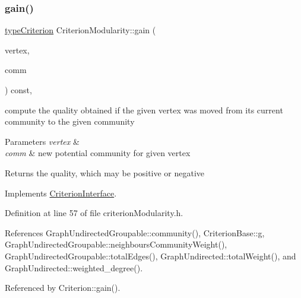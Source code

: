 \subsubsection{\texorpdfstring{gain()}{gain()}}
{\footnotesize\ttfamily \hyperlink{criterionInterface_8h_af71ff22f6355fd69a4a62104bfd59a83}{type\+Criterion} Criterion\+Modularity\+::gain (\begin{DoxyParamCaption}\item[{const \hyperlink{edge_8h_a5fbd20c46956d479cb10afc9855223f6}{type\+Vertex} \&}]{vertex,  }\item[{const \hyperlink{graphUndirectedGroupable_8h_a914da95c9ea7f14f4b7f875c36818556}{type\+Community} \&}]{comm }\end{DoxyParamCaption}) const\hspace{0.3cm}{\ttfamily [inline]}, {\ttfamily [virtual]}}

compute the quality obtained if the given vertex was moved from its current community to the given community


\begin{DoxyParams}{Parameters}
{\em vertex} & \\
\hline
{\em comm} & new potential community for given vertex \\
\hline
\end{DoxyParams}
\begin{DoxyReturn}{Returns}
the quality, which may be positive or negative 
\end{DoxyReturn}


Implements \hyperlink{classCriterionInterface_aa0beec8287cd70e16c057e7995d0caca}{Criterion\+Interface}.



Definition at line 57 of file criterion\+Modularity.\+h.



References Graph\+Undirected\+Groupable\+::community(), Criterion\+Base\+::g, Graph\+Undirected\+Groupable\+::neighbours\+Community\+Weight(), Graph\+Undirected\+Groupable\+::total\+Edges(), Graph\+Undirected\+::total\+Weight(), and Graph\+Undirected\+::weighted\+\_\+degree().



Referenced by Criterion\+::gain().

